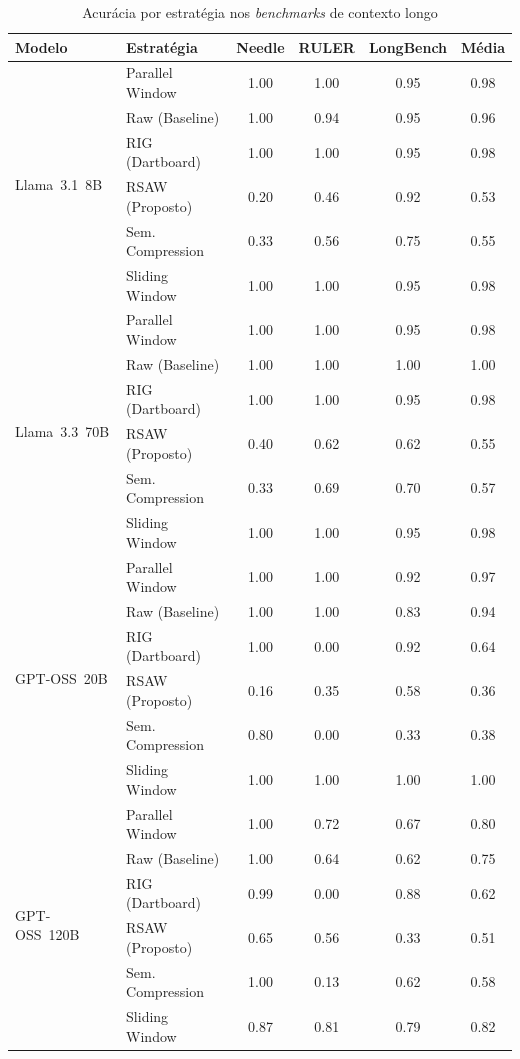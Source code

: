 \begin{table}[htbp]
    \centering
    \caption{Acurácia por estratégia nos \textit{benchmarks} de contexto longo}
    \label{tab:benchmark-results}
    \begin{tabular}{llccc|c}
    \toprule
    \textbf{Modelo} & \textbf{Estratégia} & \textbf{Needle} & \textbf{RULER} & \textbf{LongBench} & \textbf{Média} \\
    \midrule
    \multirow{6}{*}{Llama~3.1~8B}
     & Parallel Window    & 1.00 & 1.00 & 0.95 & 0.98 \\
     & Raw (Baseline)     & 1.00 & 0.94 & 0.95 & 0.96 \\
     & RIG (Dartboard)    & 1.00 & 1.00 & 0.95 & 0.98 \\
     & RSAW (Proposto)    & 0.20 & 0.46 & 0.92 & 0.53 \\
     & Sem. Compression   & 0.33 & 0.56 & 0.75 & 0.55 \\
     & Sliding Window     & 1.00 & 1.00 & 0.95 & 0.98 \\
    \midrule
    \multirow{6}{*}{Llama~3.3~70B}
     & Parallel Window    & 1.00 & 1.00 & 0.95 & 0.98 \\
     & Raw (Baseline)     & 1.00 & 1.00 & 1.00 & 1.00 \\
     & RIG (Dartboard)    & 1.00 & 1.00 & 0.95 & 0.98 \\
     & RSAW (Proposto)    & 0.40 & 0.62 & 0.62 & 0.55 \\
     & Sem. Compression   & 0.33 & 0.69 & 0.70 & 0.57 \\
     & Sliding Window     & 1.00 & 1.00 & 0.95 & 0.98 \\
    \midrule
    \multirow{6}{*}{GPT-OSS~20B}
     & Parallel Window    & 1.00 & 1.00 & 0.92 & 0.97 \\
     & Raw (Baseline)     & 1.00 & 1.00 & 0.83 & 0.94 \\
     & RIG (Dartboard)    & 1.00 & 0.00 & 0.92 & 0.64 \\
     & RSAW (Proposto)    & 0.16 & 0.35 & 0.58 & 0.36 \\
     & Sem. Compression   & 0.80 & 0.00 & 0.33 & 0.38 \\
     & Sliding Window     & 1.00 & 1.00 & 1.00 & 1.00 \\
    \midrule
    \multirow{6}{*}{GPT-OSS~120B}
     & Parallel Window    & 1.00 & 0.72 & 0.67 & 0.80 \\
     & Raw (Baseline)     & 1.00 & 0.64 & 0.62 & 0.75 \\
     & RIG (Dartboard)    & 0.99 & 0.00 & 0.88 & 0.62 \\
     & RSAW (Proposto)    & 0.65 & 0.56 & 0.33 & 0.51 \\
     & Sem. Compression   & 1.00 & 0.13 & 0.62 & 0.58 \\
     & Sliding Window     & 0.87 & 0.81 & 0.79 & 0.82 \\
    \bottomrule
    \end{tabular}
\end{table}

